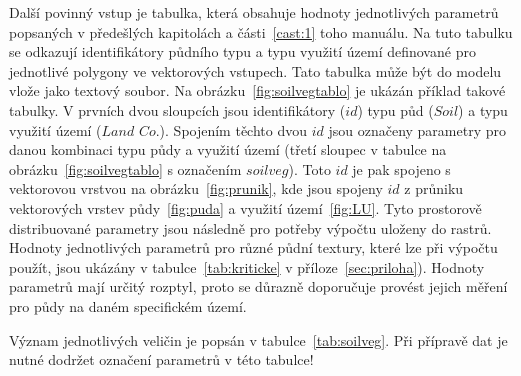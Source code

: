 Další povinný vstup je tabulka, která obsahuje hodnoty jednotlivých parametrů popsaných v předešlých kapitolách a části~\ref{cast:1} toho manuálu. Na tuto tabulku se odkazují identifikátory půdního typu a typu využití území definované pro jednotlivé polygony ve vektorových vstupech. Tato tabulka může být do modelu vlože jako textový soubor. Na obrázku~\ref{fig:soilvegtablo} je ukázán příklad takové tabulky. V prvních dvou sloupcích jsou identifikátory ($id$) typu půd ($Soil$) a typu využití území ($Land$ $Co.$). Spojením těchto dvou $id$ jsou označeny parametry pro danou kombinaci typu půdy a využití území (třetí sloupec v tabulce na obrázku~\ref{fig:soilvegtablo} s označením $soilveg$). Toto $id$ je pak spojeno s vektorovou vrstvou na obrázku~\ref{fig:prunik}, kde jsou spojeny $id$ z průniku vektorových vrstev půdy~\ref{fig:puda} a využití území~\ref{fig:LU}. Tyto prostorově distribuované parametry jsou následně pro potřeby výpočtu uloženy do rastrů. Hodnoty jednotlivých parametrů pro různé půdní textury, které lze při výpočtu použít, jsou ukázány v tabulce~\ref{tab:kriticke} v příloze~\ref{sec:priloha}). Hodnoty parametrů mají určitý rozptyl, proto se důrazně doporučuje provést jejich měření pro půdy na daném specifickém území.

Význam jednotlivých veličin je popsán v tabulce~\ref{tab:soilveg}. Při přípravě dat je nutné dodržet označení parametrů v této tabulce!




